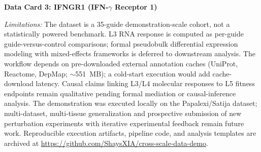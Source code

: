 \documentclass[sn-basic,Numbered,pdflatex]{sn-jnl}
\begin{document}
\vspace{6pt}

\noindent\colorbox{gray!20}{\textbf{\small Data Card 3: IFNGR1 (IFN-$\gamma$ Receptor 1)}}
\vspace{3pt}

\noindent{}
\textit{Limitations:} The dataset is a 35-guide demonstration-scale cohort, not a statistically powered benchmark. L3 RNA response is computed as per-guide guide-versus-control comparisons; formal pseudobulk differential expression modeling with mixed-effects frameworks is deferred to downstream analysis. The workflow depends on pre-downloaded external annotation caches (UniProt, Reactome, DepMap; $\sim$551~MB); a cold-start execution would add cache-download latency. Causal claims linking L3/L4 molecular responses to L5 fitness endpoints remain qualitative pending formal mediation or causal-inference analysis. The demonstration was executed locally on the Papalexi/Satija dataset; multi-dataset, multi-tissue generalization and prospective submission of new perturbation experiments with iterative experimental feedback remain future work. Reproducible execution artifacts, pipeline code, and analysis templates are archived at \url{https://github.com/ShaysXIA/cross-scale-data-demo}.
\end{document}
